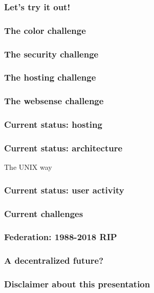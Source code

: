 \documentclass[aspectratio=169]{beamer}
\begin{document}
\begin{frame}
\frametitle{Let's try it out!}

\end{frame}

\begin{frame}
\frametitle{The color challenge}
\end{frame}

\begin{frame}
\frametitle{The security challenge}
\end{frame}

\begin{frame}
\frametitle{The hosting challenge}
\end{frame}

\begin{frame}
\frametitle{The websense challenge}
\end{frame}

\begin{frame}
\frametitle{Current status: hosting}
\end{frame}

\begin{frame}
\frametitle{Current status: architecture}
The UNIX way
\end{frame}

\begin{frame}
\frametitle{Current status: user activity}
\end{frame}

\begin{frame}
\frametitle{Current challenges}
\end{frame}

\begin{frame}
\frametitle{Federation: 1988-2018 RIP}
\end{frame}

\begin{frame}
\frametitle{A decentralized future?}
\end{frame}

\begin{frame}
\frametitle{Disclaimer about this presentation}
\end{frame}

\subtitle{Thank you}
\frame[plain]{\titlepage}
\end{document}

